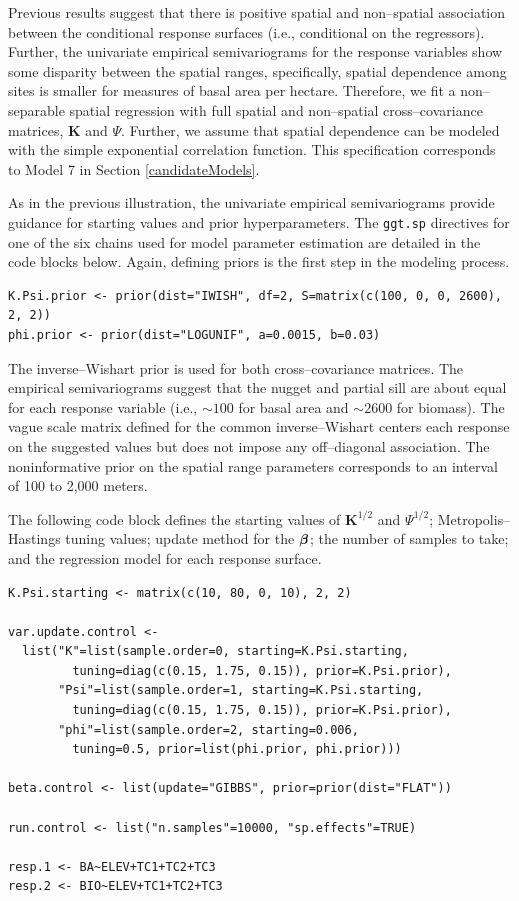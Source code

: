\documentclass[a4paper]{article}
\newcommand{\bbeta}{ \mbox{\boldmath $ \beta $} }
\newcommand{\bK}{\textbf{K}}
\let\code=\texttt
\begin{document}
Previous results suggest that there is positive spatial and non--spatial association between the conditional response surfaces (i.e., conditional on the regressors).  Further, the univariate empirical semivariograms for the response variables show some disparity between the spatial ranges, specifically, spatial dependence among sites is smaller for measures of basal area per hectare.  Therefore, we fit a non--separable spatial regression with full spatial and non--spatial cross--covariance matrices, $\bK$ and $\Psi$.  Further, we assume that spatial dependence can be modeled with the simple exponential correlation function.  This specification corresponds to Model 7 in Section \ref{candidateModels}.

As in the previous illustration, the univariate empirical semivariograms provide guidance for starting values and prior hyperparameters.  The \code{ggt.sp} directives for one of the six chains used for model parameter estimation are detailed in the code blocks below.  Again, defining priors is the first step in the modeling process.
\begin{verbatim}
K.Psi.prior <- prior(dist="IWISH", df=2, S=matrix(c(100, 0, 0, 2600), 2, 2))
phi.prior <- prior(dist="LOGUNIF", a=0.0015, b=0.03)
\end{verbatim}
The inverse--Wishart prior is used for both cross--covariance matrices.  The empirical semivariograms suggest that the nugget and partial sill are about equal for each response variable (i.e., $\sim100$ for basal area and $\sim2600$ for biomass).  The vague scale matrix defined for the common inverse--Wishart centers each response on the suggested values but does not impose any off--diagonal association.  The noninformative prior on the spatial range parameters corresponds to an interval of 100 to 2,000 meters.

The following code block defines the starting values of $\bK^{1/2}$ and $\Psi^{1/2}$; Metropolis--Hastings tuning values; update method for the $\bbeta$; the number of samples to take; and the regression model for each response surface.

\begin{verbatim}
K.Psi.starting <- matrix(c(10, 80, 0, 10), 2, 2)

var.update.control <-
  list("K"=list(sample.order=0, starting=K.Psi.starting,
         tuning=diag(c(0.15, 1.75, 0.15)), prior=K.Psi.prior),
       "Psi"=list(sample.order=1, starting=K.Psi.starting,
         tuning=diag(c(0.15, 1.75, 0.15)), prior=K.Psi.prior),
       "phi"=list(sample.order=2, starting=0.006,
         tuning=0.5, prior=list(phi.prior, phi.prior)))

beta.control <- list(update="GIBBS", prior=prior(dist="FLAT"))

run.control <- list("n.samples"=10000, "sp.effects"=TRUE)

resp.1 <- BA~ELEV+TC1+TC2+TC3
resp.2 <- BIO~ELEV+TC1+TC2+TC3
\end{verbatim}
\end{document}
